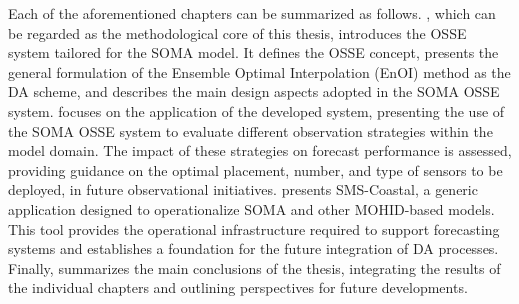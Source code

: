 Each of the aforementioned chapters can be summarized as follows. , which can be regarded as the methodological core of this thesis, introduces the OSSE system tailored for the SOMA model. It defines the OSSE concept, presents the general formulation of the Ensemble Optimal Interpolation (EnOI) method as the DA scheme, and describes the main design aspects adopted in the SOMA OSSE system.  focuses on the application of the developed system, presenting the use of the SOMA OSSE system to evaluate different observation strategies within the model domain. The impact of these strategies on forecast performance is assessed, providing guidance on the optimal placement, number, and type of sensors to be deployed, in future observational initiatives.  presents SMS-Coastal, a generic application designed to operationalize SOMA and other MOHID-based models. This tool provides the operational infrastructure required to support forecasting systems and establishes a foundation for the future integration of DA processes. Finally,  summarizes the main conclusions of the thesis, integrating the results of the individual chapters and outlining perspectives for future developments.

